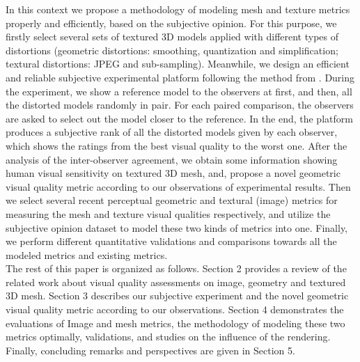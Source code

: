 In this context we propose a methodology of modeling mesh and texture metrics properly and efficiently, based on the subjective opinion. For this purpose, we firstly select several sets of textured 3D models applied with different types of distortions (geometric distortions: smoothing, quantization and simplification; textural distortions: JPEG and sub-sampling). Meanwhile, we design an efficient and reliable subjective experimental platform following the method from \cite{Farrell_2001}. During the experiment, we show a reference model to the observers at first, and then, all the distorted models randomly in pair. For each paired comparison, the observers are asked to select out the model closer to the reference. In the end, the platform produces a subjective rank of all the distorted models given by each observer, which shows the ratings from the best visual quality to the worst one. After the analysis of the inter-observer agreement, we obtain some information showing human visual sensitivity on textured 3D mesh, and, propose a novel geometric visual quality metric according to our observations of experimental results. Then we select several recent perceptual geometric and textural (image) metrics for measuring the mesh and texture visual qualities respectively, and utilize the subjective opinion dataset to model these two kinds of metrics into one. Finally, we perform different quantitative validations and comparisons towards all the modeled metrics and existing metrics.\\
The rest of this paper is organized as follows. Section 2 provides a review of the related work about visual quality assessments on image, geometry and textured 3D mesh.  Section 3 describes our subjective experiment and the novel geometric visual quality metric according to our observations.
Section 4 demonstrates the evaluations of Image and mesh metrics, the methodology of  modeling these two  metrics optimally, validations, and studies on the influence of the rendering. Finally, concluding remarks and perspectives are given in Section 5.